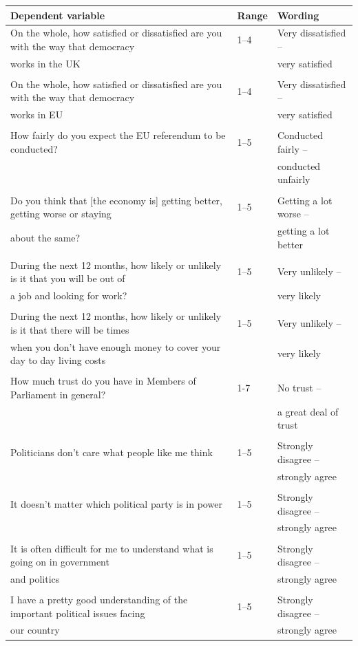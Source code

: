 \documentclass[12pt, letter]{article}
\begin{document}
\scriptsize
\begin{center}
\begin{longtable}{lll}
\toprule[1pt]
Dependent variable & Range & Wording \\
\toprule[1pt]
On the whole, how satisfied or dissatisfied are you with the way that democracy  & 1--4 & Very dissatisfied --  \\
works in the UK && very satisfied\\
 \\[-4pt]
On the whole, how satisfied or dissatisfied are you with the way that democracy  & 1--4 & Very dissatisfied --  \\
works in EU && very satisfied\\
 \\[-4pt]
How fairly do you expect the EU referendum to be conducted? & 1--5 & Conducted fairly --  \\
&& conducted unfairly\\
 \\[-4pt]
Do you think that {[}the economy is{]} getting better, getting worse or staying  & 1--5 & Getting a lot worse --  \\
about the same? && getting a lot better\\
 \\[-4pt]
During the next 12 months, how likely or unlikely is it that you will be out of  & 1--5 & Very unlikely --  \\
a job and looking for work?&& very likely\\
 \\[-4pt]
During the next 12 months, how likely or unlikely is it that there will be times  & 1--5 & Very unlikely -- \\
when you don’t have enough money to cover your day to day living costs & & very likely \\
 \\[-4pt]
How much trust do you have in Members of Parliament in general? & 1-7 & No trust --  \\
 &  &  a great deal of trust \\
 \\[-4pt]
Politicians don’t care what people like me think & 1--5 & Strongly disagree --  \\
 &  &  strongly agree\\
 \\[-4pt]
It doesn’t matter which political party is in power & 1--5 & Strongly disagree -- \\
 &  &  strongly agree\\
 \\[-4pt]
It is often difficult for me to understand what is going on in government  & 1--5 & Strongly disagree -- \\
and politics && strongly agree\\
 \\[-4pt]
I have a pretty good understanding of the important political issues facing  & 1--5 & Strongly disagree --\\
our country && strongly agree\\
\toprule[1.5pt]
\end{longtable}
\end{center}
\end{document}
